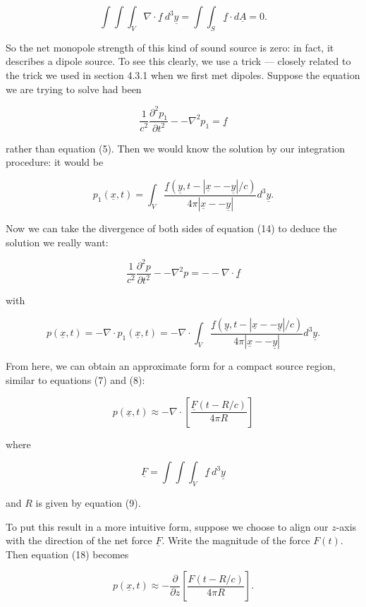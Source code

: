   $$\int \int \int_V{\nabla \cdot \underline{f} \mathrm{~}d^3 \underline{y}} = 
  \int \int_S{\underline{f} \cdot d\underline{A}} = 0 . \tag{13}$$ 

  So the net monopole strength of this kind of sound source is zero: in fact, 
  it describes a dipole source. To see this clearly, we use a trick --- closely 
  related to the trick we used in section 4.3.1 when we first met dipoles. 
  Suppose the equation we are trying to solve had been 

  $$\dfrac{1}{c^2} \dfrac{\partial^2 p_1}{\partial t^2} -- \nabla^2 p_1 = 
  \underline{f} \tag{14}$$ 

  rather than equation (5). Then we would know the solution by our integration 
  procedure: it would be 

  
  $$p_1(\underline{x},t)=\int_V{\dfrac{\underline{f}(\underline{y},t-|\underline{x} 
  -- \underline{y}|/c)}{4 \pi |\underline{x} -- \underline{y}|} d^3 
  \underline{y}} . \tag{15}$$ 

  Now we can take the divergence of both sides of equation (14) to deduce the 
  solution we really want: 

  $$\dfrac{1}{c^2} \dfrac{\partial^2 p}{\partial t^2} -- \nabla^2 p = -- \nabla 
  \cdot \underline{f} \tag{16}$$ 

  with 

  $$p(\underline{x},t) = -\nabla \cdot p_1(\underline{x},t) = -\nabla \cdot 
  \int_V{\dfrac{\underline{f}(\underline{y},t-|\underline{x} -- 
  \underline{y}|/c)}{4 \pi |\underline{x} -- \underline{y}|} d^3 \underline{y}} 
  \tag{17} .$$ 

  From here, we can obtain an approximate form for a compact source region, 
  similar to equations (7) and (8): 

  $$p(\underline{x},t) \approx -\nabla \cdot \left[ 
  \dfrac{\underline{F}(t-R/c)}{4 \pi R} \right] \tag{18}$$ 

  where 

  $$\underline{F} = \int \int \int_V{\underline{f} \mathrm{~} d^3 
  \underline{y}} \tag{19}$$ 

  and $R$ is given by equation (9). 

  To put this result in a more intuitive form, suppose we choose to align our 
  $z$-axis with the direction of the net force $\underline{F}$. Write the 
  magnitude of the force $F(t)$. Then equation (18) becomes 

  $$p(\underline{x},t) \approx -\dfrac{\partial}{\partial z} \left[ 
  \dfrac{F(t-R/c)}{4 \pi R} \right] . \tag{20}$$ 

